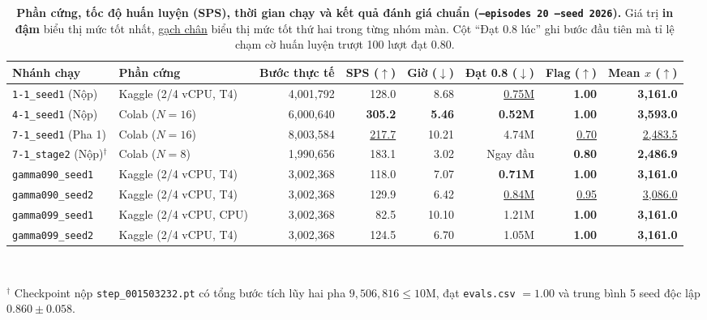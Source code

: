 \documentclass[a4paper,10pt]{article}
\begin{document}
\begin{table}[!htbp]
  \centering
  \caption{\textbf{Phần cứng, tốc độ huấn luyện (SPS), thời gian chạy và kết quả đánh giá chuẩn (\texttt{--episodes 20 --seed 2026}).} Giá trị \textbf{in đậm} biểu thị mức tốt nhất, \underline{gạch chân} biểu thị mức tốt thứ hai trong từng nhóm màn. Cột ``Đạt 0.8 lúc'' ghi bước đầu tiên mà tỉ lệ chạm cờ huấn luyện trượt 100 lượt đạt $0.80$.}
  \label{tab:results}
  \footnotesize
  \begin{tabular}{@{}llrrrrrr@{}}
    \toprule
    \textbf{Nhánh chạy} & \textbf{Phần cứng} & \textbf{Bước thực tế} & \textbf{SPS ($\uparrow$)} & \textbf{Giờ ($\downarrow$)} & \textbf{Đạt 0.8 ($\downarrow$)} & \textbf{Flag ($\uparrow$)} & \textbf{Mean $x$ ($\uparrow$)} \\
    \midrule
    \texttt{1-1\_seed1} (Nộp)      & Kaggle (2/4 vCPU, T4) & 4,001,792 & 128.0 & 8.68 & \underline{0.75M} & \textbf{1.00} & \textbf{3,161.0} \\
    \texttt{4-1\_seed1} (Nộp)      & Colab ($N=16$) & 6,000,640 & \textbf{305.2} & \textbf{5.46} & \textbf{0.52M} & \textbf{1.00} & \textbf{3,593.0} \\
    \texttt{7-1\_seed1} (Pha 1)    & Colab ($N=16$) & 8,003,584 & \underline{217.7} & 10.21 & 4.74M & \underline{0.70} & \underline{2,483.5} \\
    \texttt{7-1\_stage2} (Nộp)$^\dagger$ & Colab ($N=8$) & 1,990,656 & 183.1 & 3.02 & Ngay đầu & \textbf{0.80} & \textbf{2,486.9} \\
    \midrule
    \texttt{gamma090\_seed1}       & Kaggle (2/4 vCPU, T4) & 3,002,368 & 118.0 & 7.07 & \textbf{0.71M} & \textbf{1.00} & \textbf{3,161.0} \\
    \texttt{gamma090\_seed2}       & Kaggle (2/4 vCPU, T4) & 3,002,368 & 129.9 & 6.42 & \underline{0.84M} & \underline{0.95} & \underline{3,086.0} \\
    \texttt{gamma099\_seed1}       & Kaggle (2/4 vCPU, CPU) & 3,002,368 & 82.5 & 10.10 & 1.21M & \textbf{1.00} & \textbf{3,161.0} \\
    \texttt{gamma099\_seed2}       & Kaggle (2/4 vCPU, T4) & 3,002,368 & 124.5 & 6.70 & 1.05M & \textbf{1.00} & \textbf{3,161.0} \\
    \bottomrule
  \end{tabular}\\[2pt]
  {\scriptsize\raggedright $^\dagger$ Checkpoint nộp \texttt{step\_001503232.pt} có tổng bước tích lũy hai pha $9{,}506{,}816 \le 10\text{M}$, đạt \texttt{evals.csv} $= 1.00$ và trung bình 5 seed độc lập $0.860 \pm 0.058$.}
\end{table}
\end{document}
